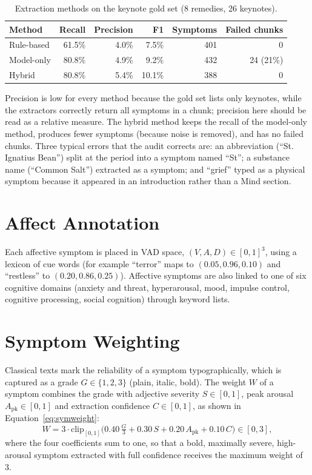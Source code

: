 \documentclass[12pt,a4paper,oneside]{report}
\begin{document}
\begin{table}[H]
\centering
\caption{Extraction methods on the keynote gold set (8 remedies, 26 keynotes).}
\label{tab:extract}
\small
\begin{tabular}{@{}lrrrrr@{}}
\toprule
Method & Recall & Precision & F1 & Symptoms & Failed chunks\\
\midrule
Rule-based & 61.5\% & 4.0\% & 7.5\% & 401 & 0\\
Model-only & 80.8\% & 4.9\% & 9.2\% & 432 & 24 (21\%)\\
Hybrid & 80.8\% & 5.4\% & 10.1\% & 388 & 0\\
\bottomrule
\end{tabular}
\end{table}

Precision is low for every method because the gold set lists only keynotes, while the extractors correctly return all symptoms in a chunk; precision here should be read as a relative measure. The hybrid method keeps the recall of the model-only method, produces fewer symptoms (because noise is removed), and has no failed chunks. Three typical errors that the audit corrects are: an abbreviation (``St. Ignatius Bean'') split at the period into a symptom named ``St''; a substance name (``Common Salt'') extracted as a symptom; and ``grief'' typed as a physical symptom because it appeared in an introduction rather than a Mind section.

\section{Affect Annotation}
Each affective symptom is placed in VAD space, $(V, A, D) \in [0,1]^3$, using a lexicon of cue words (for example ``terror'' maps to $(0.05, 0.96, 0.10)$ and ``restless'' to $(0.20, 0.86, 0.25)$). Affective symptoms are also linked to one of six cognitive domains (anxiety and threat, hyperarousal, mood, impulse control, cognitive processing, social cognition) through keyword lists.

\section{Symptom Weighting}
Classical texts mark the reliability of a symptom typographically, which is captured as a grade $G \in \{1,2,3\}$ (plain, italic, bold). The weight $W$ of a symptom combines the grade with adjective severity $S \in [0,1]$, peak arousal $A_{\text{pk}} \in [0,1]$ and extraction confidence $C \in [0,1]$, as shown in Equation~\eqref{eq:symweight}:
\begin{equation}
  W = 3\cdot \mathrm{clip}_{[0,1]}\Big(0.40\,\tfrac{G}{3} + 0.30\,S + 0.20\,A_{\text{pk}} + 0.10\,C\Big) \in [0, 3],
  \label{eq:symweight}
\end{equation}
where the four coefficients sum to one, so that a bold, maximally severe, high-arousal symptom extracted with full confidence receives the maximum weight of 3.
\end{document}
